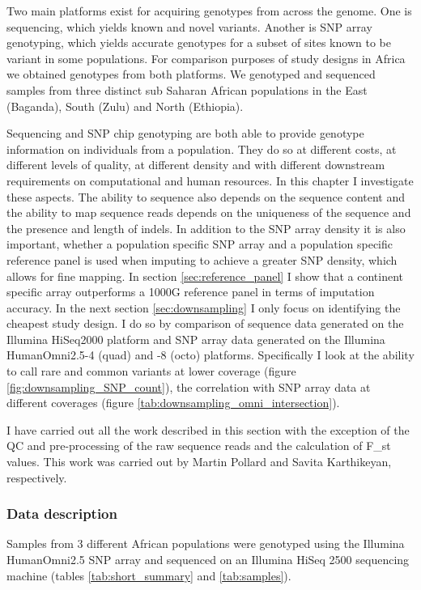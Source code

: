 Two main platforms exist for acquiring genotypes from across the genome. One is sequencing, which yields known and novel variants. Another is SNP array genotyping, which yields accurate genotypes for a subset of sites known to be variant in some populations. For comparison purposes of study designs in Africa we obtained genotypes from both platforms. We genotyped and sequenced samples from three distinct sub Saharan African populations in the East (Baganda), South (Zulu) and North (Ethiopia).

Sequencing and \gls{SNP} chip genotyping are both able to provide genotype information on individuals from a population. They do so at different costs, at different levels of quality, at different density and with different downstream requirements on computational and human resources. In this chapter I investigate these aspects. The ability to sequence also depends on the sequence content and the ability to map sequence reads depends on the uniqueness of the sequence and the presence and length of indels. In addition to the \gls{SNP} array density it is also important, whether a population specific \gls{SNP} array and a population specific reference panel is used when imputing to achieve a greater SNP density, which allows for fine mapping. In section \ref{sec:reference_panel} I show that a continent specific array outperforms a 1000G reference panel in terms of imputation accuracy. In the next section \ref{sec:downsampling} I only focus on identifying the cheapest study design. I do so by comparison of sequence data generated on the Illumina HiSeq2000 platform and SNP array data generated on the Illumina HumanOmni2.5-4 (quad) and -8 (octo) platforms. Specifically I look at the ability to call rare and common variants at lower coverage (figure \ref{fig:downsampling_SNP_count}), the correlation with SNP array data at different coverages (figure \ref{tab:downsampling_omni_intersection}).

I have carried out all the work described in this section with the exception of the QC and pre-processing of the raw sequence reads and the calculation of F_{st} values. This work was carried out by Martin Pollard and Savita Karthikeyan, respectively.

\subsubsection{Data description}
Samples from 3 different African populations were genotyped using the Illumina HumanOmni2.5 SNP array and sequenced on an Illumina HiSeq 2500 sequencing machine (tables \ref{tab:short_summary} and \ref{tab:samples}).

